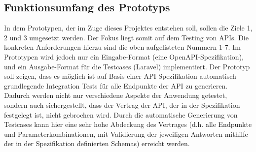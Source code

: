 \subsection{Funktionsumfang des Prototyps}

In dem Prototypen, der im Zuge dieses Projektes entstehen soll, sollen die Ziele 1, 2 und 3 umgesetzt werden. Der Fokus liegt somit auf dem Testing von APIs. Die konkreten Anforderungen hierzu sind die oben aufgelisteten Nummern 1-7. Im Prototypen wird jedoch nur ein Eingabe-Format (eine OpenAPI-Spezifikation), und ein Ausgabe-Format für die Testcases (Laravel) implementiert. Der Prototyp soll zeigen, dass es möglich ist auf Basis einer API Spezifikation automatisch grundlegende Integration Tests für alle Endpunkte der API zu generieren. Dadurch werden nicht nur verschiedene Aspekte der Anwendung getestet, sondern auch sichergestellt, dass der Vertrag der API, der in der Spezifikation festgelegt ist, nicht gebrochen wird. Durch die automatische Generierung von Testcases kann hier eine sehr hohe Abdeckung des Vertrages (d.h. alle Endpunkte und Parameterkombinationen, mit Validierung der jeweiligen Antworten mithilfe der in der Spezifikation definierten Schemas) erreicht werden.\\